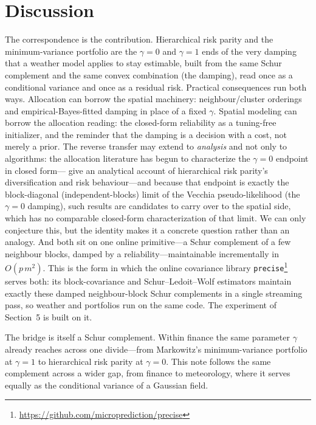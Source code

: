 \documentclass[11pt]{article}
\begin{document}
\section{Discussion}
The correspondence is the contribution. Hierarchical risk parity and the minimum-variance portfolio
are the $\gamma=0$ and $\gamma=1$ ends of the very damping that a weather model applies to stay
estimable, built from the same Schur complement and the same convex combination (the damping),
read once as a conditional variance and once as a residual risk. Practical
consequences run both ways. Allocation can borrow the spatial machinery: neighbour/cluster orderings
and empirical-Bayes-fitted damping in place of a fixed $\gamma$. Spatial modeling can borrow the
allocation reading: the closed-form reliability as a tuning-free initializer, and the reminder that the
damping is a decision with a cost, not merely a prior. The reverse transfer may extend to
\emph{analysis} and not only to algorithms: the allocation literature has begun to characterize the
$\gamma=0$ endpoint in closed form---\citet{antonov2024} give an analytical account of hierarchical
risk parity's diversification and risk behaviour---and because that endpoint is exactly the
block-diagonal (independent-blocks) limit of the Vecchia pseudo-likelihood (the $\gamma=0$ damping), such
results are candidates to carry over to the spatial side, which has no comparable closed-form
characterization of that limit. We can only conjecture this, but the identity makes it a concrete
question rather than an analogy. And both sit on one online primitive---a Schur
complement of a few neighbour blocks, damped by a reliability---maintainable incrementally in
$O(p\,m^2)$. This is the form in which the online covariance library
\texttt{precise}\footnote{\url{https://github.com/microprediction/precise}} serves both: its
block-covariance and Schur--Ledoit--Wolf estimators maintain exactly these damped neighbour-block Schur
complements in a single streaming pass, so weather and portfolios run on the same code. The experiment
of Section~5 is built on it.

The bridge is itself a Schur complement. Within finance the same parameter $\gamma$ already reaches
across one divide---from Markowitz's minimum-variance portfolio at $\gamma=1$ to hierarchical risk
parity at $\gamma=0$. This note follows the same complement across a wider gap, from finance to
meteorology, where it serves equally as the conditional variance of a Gaussian field.



\end{document}
